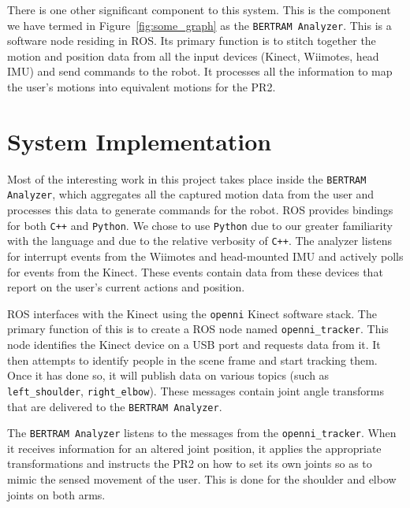 \documentclass{sig-alternate}
\begin{document}
There is one other significant component to this system. This is the
component we have
termed in Figure~\ref{fig:some_graph} as the {\tt BERTRAM Analyzer}. This is a 
software node residing in ROS. Its primary function is to stitch together the
motion and position data from all the input devices (Kinect, Wiimotes, head 
IMU) and send commands to the robot. It processes all the information to map the user's motions
into equivalent motions for the PR2.

\section{System Implementation}
\label{sec:system_implementation}
Most of the interesting work in this project takes place inside the
{\tt BERTRAM Analyzer}, which aggregates all the captured motion data from the
user and processes this data to generate commands for the robot. ROS provides
bindings for both {\tt C++} and {\tt Python}. We chose to use {\tt Python} due to our
greater familiarity with the language and due to the relative verbosity of {\tt C++}.
The analyzer listens for interrupt events from the Wiimotes and head-mounted
IMU and actively polls for events from the Kinect. These events contain data
from these devices that report on the user's current actions and position.

ROS interfaces with the Kinect using the {\tt openni} Kinect software stack. The primary
function of this is to create a ROS node named {\tt openni\_tracker}. This
node identifies the Kinect device on a USB port and requests data
from it. It then attempts to identify people in the scene frame and start
tracking them. Once it has done so, it will publish data on various
topics (such as {\tt left\_shoulder}, {\tt right\_elbow}). These messages
contain joint angle transforms that are delivered to the {\tt BERTRAM Analyzer}.

The {\tt BERTRAM Analyzer} listens to the messages from the
 {\tt openni\_tracker}.
When it receives information for an altered joint position, it applies the
appropriate transformations and instructs the PR2 on how to set its own joints
so as to mimic the sensed movement of the user. This is done for the shoulder
and elbow joints on both arms.
\end{document}
